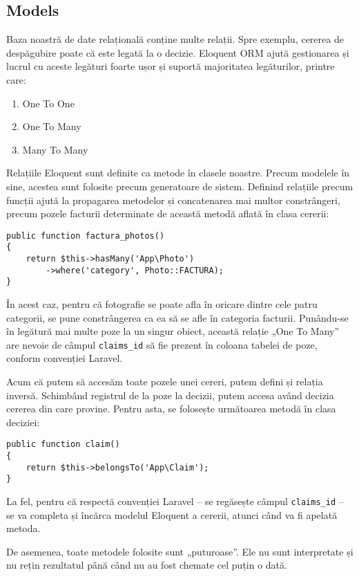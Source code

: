 \subsection{Models}

	Baza noastră de date relațională conține multe relații.
	Spre exemplu, cererea de despăgubire poate că este legată la o decizie.
	Eloquent ORM ajută gestionarea și lucrul cu aceste legături foarte ușor și suportă majoritatea legăturilor, printre care:
	\begin{enumerate}
		\item One To One
		\item One To Many
		\item Many To Many
	\end{enumerate}

	Relațiile Eloquent sunt definite ca metode în clasele noastre.
	Precum modelele în sine, acestea sunt folosite precum generatoare de sistem.
	Definind relațiile precum funcții ajută la propagarea metodelor și concatenarea mai multor constrângeri, precum pozele facturii determinate de această metodă aflată în clasa cererii:
\begin{Verbatim}
public function factura_photos()
{
	return $this->hasMany('App\Photo')
		->where('category', Photo::FACTURA);
}
\end{Verbatim}
	În acest caz, pentru că fotografie se poate afla în oricare dintre cele patru categorii, se pune constrângerea ca ea să se afle în categoria facturii.
	Punându-se în legătură mai multe poze la un singur obiect, această relație „One To Many” are nevoie de câmpul \verb|claims_id| să fie prezent în coloana tabelei de poze, conform convenției Laravel. \cite{laravel_relationships}

	Acum că putem să accesăm toate pozele unei cereri, putem defini și relația inversă.
	Schimbând registrul de la poze la decizii, putem accesa având decizia cererea din care provine.
	Pentru asta, se folosește următoarea metodă în clasa deciziei:
\begin{Verbatim}
public function claim()
{
	return $this->belongsTo('App\Claim');
}
\end{Verbatim}
	La fel, pentru că respectă convenției Laravel -- se regăsește câmpul \verb|claims_id| -- se va completa și încărca modelul Eloquent a cererii, atunci când va fi apelată metoda.

	De asemenea, toate metodele folosite sunt „puturoase”.
	Ele nu sunt interpretate și nu rețin rezultatul până când nu au fost chemate cel puțin o dată.

